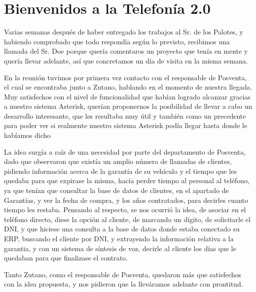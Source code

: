 
\newpage

\color[rgb]{0,0,1}

\section{Bienvenidos a la Telefonía 2.0}

Varias semanas después de haber entregado los trabajos al Sr. de los Palotes, y habiendo comprobado que todo respondía según lo previsto, recibimos una llamada del Sr. Doe porque quería comentaros un proyecto que tenía en mente y quería llevar adelante, así que concretamos un día de visita en la misma semana.

En la reunión tuvimos por primera vez contacto con el responsable de Posventa, el cual se encontraba junto a Zutano, hablando en el momento de nuestra llegada. Muy satisfechos con el nivel de funcionalidad que habían logrado alcanzar gracias a nuestro sistema Asterisk, querían proponernos la posibilidad de llevar a cabo un desarrollo interesante, que les resultaba muy útil y también como un precedente para poder ver si realmente nuestro sistema Asterisk podía llegar hasta donde le habíamos dicho

La idea surgía a raíz de una necesidad por parte del departamento de Posventa, dado que observaron que existía un amplio número de llamadas de clientes, pidiendo información acerca de la garantía de su vehículo y el tiempo que les quedaba para que expirase la misma, hacía perder tiempo al personal al teléfono, ya que tenían que consultar la base de datos de clientes, en el apartado de Garantías, y ver la fecha de compra, y los años contratados, para decirles cuanto tiempo les restaba. Pensando al respecto, se nos ocurrió la idea, de asociar en el teléfono directo, diese la opción al cliente, de marcando un dígito, de solicitarle el DNI, y que hiciese una consulta a la base de datos donde estaba conectado su ERP, buscando el cliente por DNI, y extrayendo la información relativa a la garantia, y con un sistema de síntesis de voz, decirle al cliente los días que le quedaban para que finalizase el contrato.

Tanto Zutano, como el responsable de Posventa, quedaron más que satisfechos con la idea propuesta, y nos pidieron que la lleváramos adelante con prontitud.


